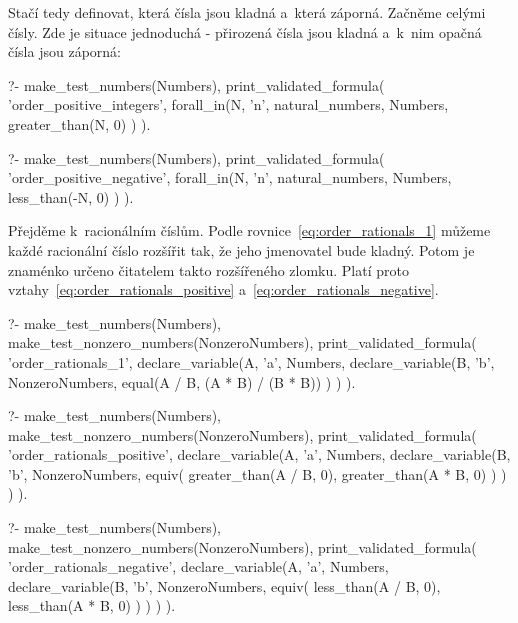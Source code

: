 Stačí tedy definovat, která čísla jsou kladná a~která záporná. Začněme celými čísly. Zde je situace jednoduchá - přirozená čísla jsou kladná a~k~nim opačná čísla jsou záporná:

\begin{fact}
\begin{prolog}
?-	make_test_numbers(Numbers),
	print_validated_formula(
		'order_positive_integers',
		forall_in(N, 'n', natural_numbers, Numbers,
			greater_than(N, 0)
		)
	).
\end{prolog}
\begin{prolog}
?-	make_test_numbers(Numbers),
	print_validated_formula(
		'order_positive_negative',
		forall_in(N, 'n', natural_numbers, Numbers,
			less_than(-N, 0)
		)
	).
\end{prolog}
\end{fact}

Přejděme k~racionálním číslům. Podle rovnice~\eqref{eq:order_rationals_1} můžeme každé racionální číslo rozšířit tak, že jeho jmenovatel bude kladný. Potom je znaménko určeno čitatelem takto rozšířeného zlomku. Platí proto vztahy~\eqref{eq:order_rationals_positive} a~\eqref{eq:order_rationals_negative}.

\begin{prolog}
?-	make_test_numbers(Numbers),
	make_test_nonzero_numbers(NonzeroNumbers),
	print_validated_formula(
		'order_rationals_1',
		declare_variable(A, 'a', Numbers,
			declare_variable(B, 'b', NonzeroNumbers,
				equal(A / B, (A * B) / (B * B))
			)
		)
	).
\end{prolog}

\begin{fact}
\begin{prolog}
?-	make_test_numbers(Numbers),
	make_test_nonzero_numbers(NonzeroNumbers),
	print_validated_formula(
		'order_rationals_positive',
		declare_variable(A, 'a', Numbers,
			declare_variable(B, 'b', NonzeroNumbers,
				equiv(
					greater_than(A / B, 0),
					greater_than(A * B, 0)
				)
			)
		)
	).
\end{prolog}
\begin{prolog}
?-	make_test_numbers(Numbers),
	make_test_nonzero_numbers(NonzeroNumbers),
	print_validated_formula(
		'order_rationals_negative',
		declare_variable(A, 'a', Numbers,
			declare_variable(B, 'b', NonzeroNumbers,
				equiv(
					less_than(A / B, 0),
					less_than(A * B, 0)
				)
			)
		)
	).
\end{prolog}
\end{fact}

